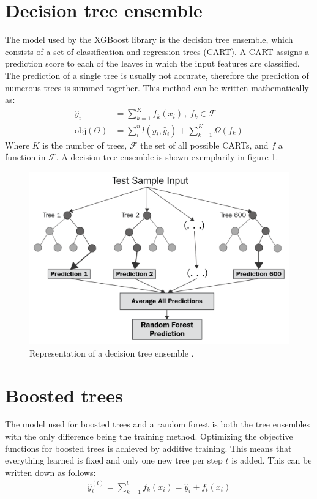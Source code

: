\section{Decision tree ensemble}
The model used by the XGBoost library is the decision tree ensemble, which consists of a set of classification and regression trees (CART).
A CART assigns a prediction score to each of the leaves in which the input features are classified. The prediction of a single tree is usually not accurate,
therefore the prediction of numerous trees is summed together. This method can be written mathematically as:
\begin{align}
  \hat{y}_i &= \sum_{k=1}^K f_k(x_i)\,, \: f_k \in \mathcal{F} \\
  \text{obj}(\Theta) &= \sum_i^n l(y_i, \hat{y}_i) + \sum_{k=1}^K \Omega(f_k)
\end{align}
Where $K$ is the number of trees, $\mathcal{F}$ the set of all possible CARTs, and $f$ a function in $\mathcal{F}$. A decision tree ensemble is shown exemplarily in
figure \ref{fig:random_forest}.

\begin{figure}
  \centering
  \includegraphics[height=0.6\textwidth]{images/random_forest.png}
  \caption{Representation of a decision tree ensemble \cite{random_forest}.}
  \label{fig:random_forest}
\end{figure}

\section{Boosted trees}
The model used for boosted trees and a random forest is both the tree ensembles with the only difference being the training method. Optimizing the objective functions for
boosted trees is achieved by additive training. This means that everything learned is fixed and only one new tree per step $t$ is added. This can be written
down as follows:
\begin{align}
  \hat{y}_i^{(t)} = \sum_{k=1}^t f_k(x_i) = \hat{y}_i + f_t(x_i)
\end{align}

